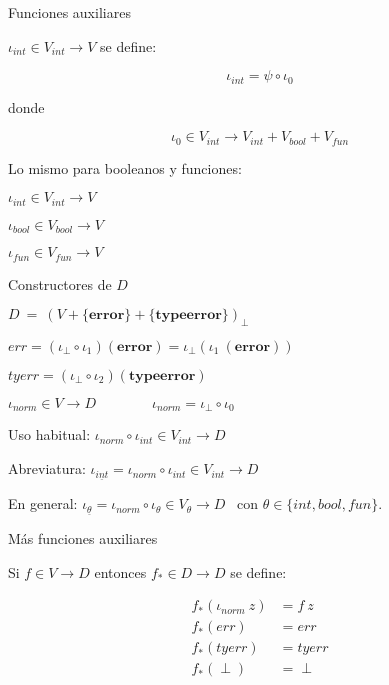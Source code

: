 \documentclass[handout]{beamer}
\newcommand{\injD}[1]{\iota_{\underline{#1}}}
\begin{document}
\begin{frame}{Funciones auxiliares}

$\iota_{int}\in V_{int}\rightarrow V$ se define:

\[\iota_{int} = \psi \circ \iota_0\]

donde 

\[\iota_0\in V_{int}\rightarrow V_{int}+V_{bool}+V_{fun}\]\pause

\bigskip

Lo mismo para booleanos y funciones:

\bigskip

$\iota_{int}\in V_{int}\rightarrow V$

\medskip

$\iota_{bool}\in V_{bool}\rightarrow V$

\medskip

$\iota_{fun}\in V_{fun}\rightarrow V$


\end{frame}




\begin{frame}{Constructores de $D$}


\qquad\qquad$D\ = \ (V + \{\textbf{error}\} + \{\textbf{typeerror}\})_\perp$


\bigskip

$err = (\iota_\perp \circ\iota_{1})(\textbf{error}) = \iota_\perp(\iota_{1}\ (\textbf{error}))$ 

\bigskip

$tyerr = (\iota_\perp \circ\iota_{2})(\textbf{typeerror})$\pause

\bigskip

$\iota_{norm} \in V \rightarrow D\qquad\qquad \iota_{norm} = \iota_\perp\circ\iota_0$ \pause

\bigskip

Uso habitual: $\iota_{norm} \circ \iota_{int} \in V_{int} \to D$ 

\medskip

Abreviatura: $\injD{int} = \iota_{norm} \circ \iota_{int} \in V_{int} \to D$

\medskip

En general:
$\injD{\theta} = \iota_{norm} \circ \iota_{\theta} \in V_{\theta} \to
D \enspace \text{ con } \theta \in \{int, bool, fun\}$.

\end{frame}


\begin{frame}{Más funciones auxiliares}

Si $f\in V\rightarrow D$ entonces $f_{*}\in D\rightarrow D$  se define:

\bigskip
\begin{align*}
f_* (\iota_{norm}\ z) &= f\ z\\
f_* (err) & = err\\
f_* (tyerr) &= tyerr\\
f_* (\perp) &= \perp
\end{align*}
\end{frame}
\end{document}
